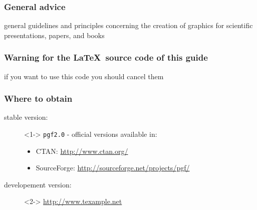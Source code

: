 \begin{frame}
	\frametitle{General advice}
	{
		\begin{center}
		\end{center}
		general guidelines and principles concerning the \alert{creation of graphics for scientific presentations, papers, and books}
	}
\end{frame}






\begin{frame}
	\frametitle{Warning for the \LaTeX\ source code of this guide}
	\begin{center}
	\end{center}
	if you want to use this code you should cancel them
\end{frame}





\begin{frame}
	\frametitle{Where to obtain \Tikz}
	\begin{description}
		\item[stable version:]<1-> \texttt{pgf2.0} - official versions available in:
			\vspace{0.3cm}
			\begin{itemize}
				\item<1-> CTAN: \url{http://www.ctan.org/}
				\vspace{0.1cm}
				\item<1-> SourceForge: \url{http://sourceforge.net/projects/pgf/}
			\end{itemize}
		\vspace{1.0cm}
		\item[developement version:]<2-> \url{http://www.texample.net}
	\end{description}
\end{frame}





